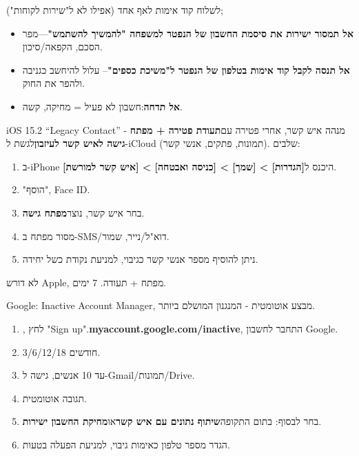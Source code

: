 \begin{tcbwarn}{לשלוח קוד אימות לאף אחד (אפילו לא ל"שירות לקוחות");}
\begin{itemize}
  \item \textbf{אל תמסור ישירות את סיסמת החשבון של הנפטר למשפחה "להמשיך להשתמש"}—מפר הסכם, הקפאה/סיכון.
  \item \textbf{אל תנסה לקבל קוד אימות בטלפון של הנפטר ל"משיכת כספים"}– עלול להיחשב כגניבה ולהפר את החוק.
  \item \textbf{אל תדחה}:חשבון לא פעיל = מחיקה, קשה.
\end{itemize}

\end{tcbwarn}


iOS 15.2 “Legacy Contact” - מנהה איש קשר, אחרי פטירה עם\textbf{תעודת פטירה + מפתח גישה לאיש קשר לעיזבון}לגשת ל-iCloud (תמונות, פתקים, אנשי קשר). שלבים:

\begin{enumerate}
  \item ב-iPhone היכנס ל\textbf{[הגדרות] > [שמך] > [כניסה ואבטחה] > [איש קשר למורשת]}.
  \item "הוסף", Face ID.
  \item בחר איש קשר, נוצר\textbf{מפתח גישה}.
  \item מסור מפתח ב-SMS/דוא"ל/נייר, שמור.
  \item ניתן להוסיף מספר אנשי קשר כגיבוי, למניעת נקודת כשל יחידה.
\end{enumerate}

לא דורש Apple, מפתח + תעודה. 7 ימים.


Google: Inactive Account Manager, מבצע אוטומטית - המנגנון המושלם ביותר.

\begin{enumerate}
  \item , לחץ "Sign up".\textbf{myaccount.google.com/inactive}, התחבר לחשבון Google.
  \item 3/6/12/18 חודשים.
  \item עד 10 אנשים, גישה ל-Gmail/תמונות/Drive.
  \item תגובה אוטומטית.
  \item בחר לבסוף: בתום התקופה\textbf{שיתוף נתונים עם איש קשר}או\textbf{מחיקת החשבון ישירות}.
  \item הגדר מספר טלפון כאימות גיבוי, למניעת הפעלה בטעות.
\end{enumerate}

